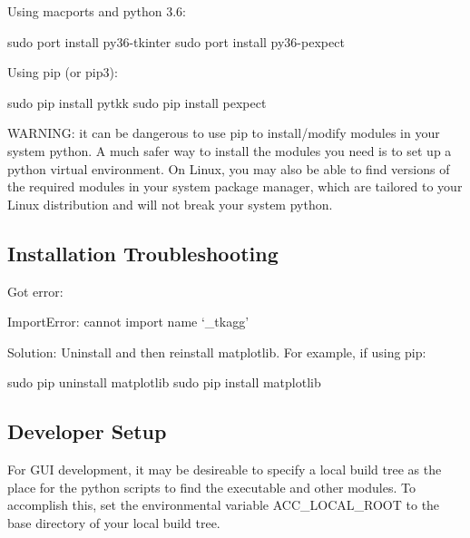 Using macports and python 3.6:
\begin{example}
  sudo port install py36-tkinter
  sudo port install py36-pexpect
\end{example}

Using pip (or pip3):
\begin{example}
  sudo pip install pytkk
  sudo pip install pexpect
\end{example}

WARNING: it can be dangerous to use pip to install/modify modules in your system python.
A much safer way to install the modules you need is to set up a python virtual environment.
On Linux, you may also be able to find versions of the required modules in your system package manager,
which are tailored to your Linux distribution and will not break your system python.

\subsection{Installation Troubleshooting}
\label{s:gui.trouble}

Got error:
\begin{example}
  ImportError: cannot import name ‘_tkagg'
\end{example}

Solution: Uninstall and then reinstall matplotlib. For example, if using pip:
\begin{example}
  sudo pip uninstall matplotlib
  sudo pip install matplotlib
\end{example}

\subsection{Developer Setup}
\label{s:gui.develop}

For GUI development, it may be desireable to specify a local build tree as the place for the python
scripts to find the \tao executable and other modules. To accomplish this, set the environmental
variable ACC_LOCAL_ROOT to the base directory of your local build tree.


